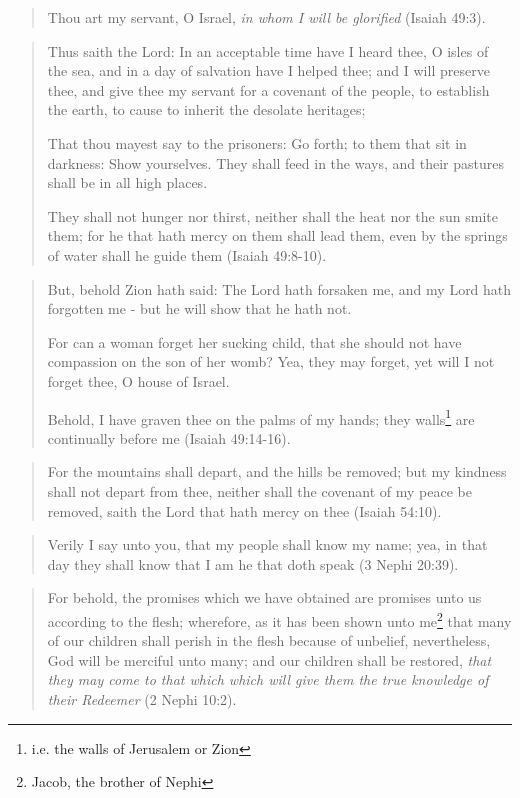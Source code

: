 \begin{quotation}
Thou art my servant, O Israel, \textit{in whom I will be glorified} (Isaiah 49:3).
\end{quotation}

\begin{quotation}
Thus saith the Lord: In an acceptable time have I heard thee, O isles of the sea, and in a day of salvation have I helped thee; and I will preserve thee, and give thee my servant for a covenant of the people, to establish the earth, to cause to inherit the desolate heritages;

That thou mayest say to the prisoners: Go forth; to them that sit in darkness: Show yourselves. They shall feed in the ways, and their pastures shall be in all high places.

They shall not hunger nor thirst, neither shall the heat nor the sun smite them; for he that hath mercy on them shall lead them, even by the springs of water shall he guide them (Isaiah 49:8-10).
\end{quotation}

\begin{quotation}
But, behold Zion hath said: The Lord hath forsaken me, and my Lord hath forgotten me - but he will show that he hath not.

For can a woman forget her sucking child, that she should not have compassion on the son of her womb? Yea, they may forget, yet will I not forget thee, O house of Israel.

Behold, I have graven thee on the palms of my hands; they walls\footnote{i.e. the walls of Jerusalem or Zion} are continually before me (Isaiah 49:14-16).
\end{quotation}

\begin{quotation}
For the mountains shall depart, and the hills be removed; but my kindness shall not depart from thee, neither shall the covenant of my peace be removed, saith the Lord that hath mercy on thee (Isaiah 54:10).
\end{quotation}

\begin{quotation}
Verily I say unto you, that my people shall know my name; yea, in that day they shall know that I am he that doth speak (3 Nephi 20:39).
\end{quotation}

\begin{quotation}
For behold, the promises which we have obtained are promises unto us according to the flesh; wherefore, as it has been shown unto me\footnote{Jacob, the brother of Nephi} that many of our children shall perish in the flesh because of unbelief, nevertheless, God will be merciful unto many; and our children shall be restored, \textit{that they may come to that which which will give them the true knowledge of their Redeemer} (2 Nephi 10:2).
\end{quotation}

